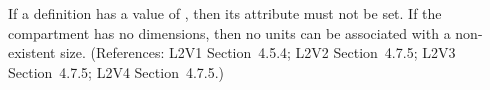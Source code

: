 If a \Compartment definition has a  value
of , then its  attribute must not be set. If the
compartment has no dimensions, then no units can be associated
with a non-existent size.  (References: L2V1 Section~4.5.4;
L2V2 Section~4.7.5; L2V3 Section~4.7.5; L2V4 Section~4.7.5.)
